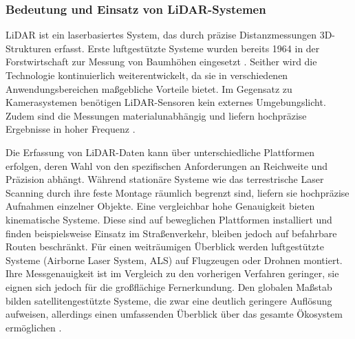\subsubsection{Bedeutung und Einsatz von LiDAR-Systemen}

LiDAR ist ein laserbasiertes System, das durch präzise Distanzmessungen 3D-Strukturen erfasst. Erste luftgestützte Systeme wurden bereits 1964 in der Forstwirtschaft zur Messung von Baumhöhen eingesetzt \cite{thapaForestAbovegroundBiomass2025}. Seither wird die Technologie kontinuierlich weiterentwickelt, da sie in verschiedenen Anwendungsbereichen maßgebliche Vorteile bietet. Im Gegensatz zu Kamerasystemen benötigen LiDAR-Sensoren kein externes Umgebungslicht. Zudem sind die Messungen materialunabhängig und liefern hochpräzise Ergebnisse in hoher Frequenz \cite{lopacApplicationLaserSystems2022}.

Die Erfassung von LiDAR-Daten kann über unterschiedliche Plattformen erfolgen, deren Wahl von den spezifischen Anforderungen an Reichweite und Präzision abhängt. Während stationäre Systeme wie das terrestrische Laser Scanning durch ihre feste Montage räumlich begrenzt sind, liefern sie hochpräzise Aufnahmen einzelner Objekte. Eine vergleichbar hohe Genauigkeit bieten kinematische Systeme. Diese sind auf beweglichen Plattformen installiert und finden beispielsweise Einsatz im Straßenverkehr, bleiben jedoch auf befahrbare Routen beschränkt. Für einen weiträumigen Überblick werden luftgestützte Systeme (Airborne Laser System, \ac{ALS}) auf Flugzeugen oder Drohnen montiert. Ihre Messgenauigkeit ist im Vergleich zu den vorherigen Verfahren geringer, sie eignen sich jedoch für die großflächige Fernerkundung. Den globalen Maßstab bilden satellitengestützte Systeme, die zwar eine deutlich geringere Auflösung aufweisen, allerdings einen umfassenden Überblick über das gesamte Ökosystem ermöglichen \cite{lopacApplicationLaserSystems2022}.